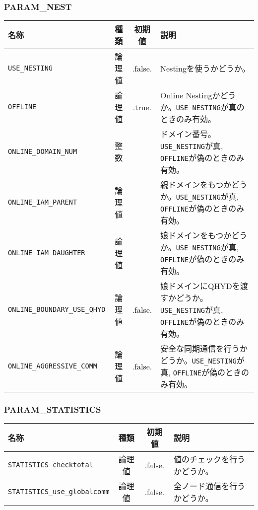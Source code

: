 \subsubsection{PARAM\_NEST}
\begin{tabularx}{150mm}{|l|c|c|X|} \hline
 \rowcolor[gray]{0.9} 名称 & 種類 & 初期値 & 説明 \\ \hline
 \verb|USE_NESTING| & 論理値 & .false. & Nestingを使うかどうか。 \\ \hline
 \verb|OFFLINE| & 論理値 & .true. & Online Nestingかどうか。\verb|USE_NESTING|が真のときのみ有効。 \\ \hline
 \verb|ONLINE_DOMAIN_NUM| & 整数 &  & ドメイン番号。\verb|USE_NESTING|が真, \verb|OFFLINE|が偽のときのみ有効。 \\ \hline
 \verb|ONLINE_IAM_PARENT| & 論理値 &  & 親ドメインをもつかどうか。\verb|USE_NESTING|が真, \verb|OFFLINE|が偽のときのみ有効。 \\ \hline
 \verb|ONLINE_IAM_DAUGHTER| & 論理値 &  & 娘ドメインをもつかどうか。\verb|USE_NESTING|が真, \verb|OFFLINE|が偽のときのみ有効。 \\ \hline
 \verb|ONLINE_BOUNDARY_USE_QHYD| & 論理値 & .false. & 娘ドメインにQHYDを渡すかどうか。\verb|USE_NESTING|が真, \verb|OFFLINE|が偽のときのみ有効。 \\ \hline
 \verb|ONLINE_AGGRESSIVE_COMM| & 論理値 & .false. & 安全な同期通信を行うかどうか。\verb|USE_NESTING|が真, \verb|OFFLINE|が偽のときのみ有効。 \\ \hline
\end{tabularx}


\subsubsection{PARAM\_STATISTICS}
\begin{tabularx}{150mm}{|l|c|c|X|} \hline
 \rowcolor[gray]{0.9} 名称 & 種類 & 初期値 & 説明 \\ \hline
 \verb|STATISTICS_checktotal| & 論理値 & .false. & 値のチェックを行うかどうか。 \\ \hline
 \verb|STATISTICS_use_globalcomm| & 論理値 & .false. & 全ノード通信を行うかどうか。 \\ \hline
\end{tabularx}


